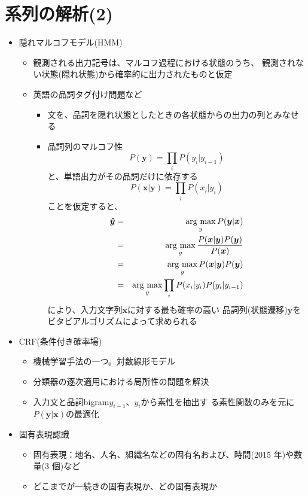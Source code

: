 \documentclass[a4j,11pt]{jsarticle}
\newcommand{\argmax}{\mathop{\rm arg~max}\limits}
\begin{document}
\section{系列の解析(2)}
\begin{itemize}
 \item 隠れマルコフモデル(HMM)
       \begin{itemize}
	\item 観測される出力記号は、マルコフ過程における状態のうち、
	      観測されない状態(隠れ状態)から確率的に出力されたものと仮定
	\item 英語の品詞タグ付け問題など
	      \begin{itemize}
	       \item 文を、品詞を隠れ状態としたときの各状態からの出力の列とみなせる
	       \item 品詞列のマルコフ性
		     \[
		      P(\bm{y}) = \prod_i P(y_i|y_{i-1})
		     \]
		     と、単語出力がその品詞だけに依存する
		     \[
		      P(\bm{x}|\bm{y}) = \prod_i P(x_i|y_i)
		     \]
		     ことを仮定すると、
		     \begin{eqnarray*}
		      \bm{\hat{y}} &=& \argmax_{y} P(\bm{y}|\bm{x}) \\
		      &=& \argmax_{y} \frac{P(\bm{x}|\bm{y})P(\bm{y})}{P(\bm{x})} \\
		      &=& \argmax_{y} P(\bm{x}|\bm{y})P(\bm{y}) \\
		      &=& \argmax_{y} \prod_i{P(x_i|y_i)P(y_i|y_{i-1})}
		     \end{eqnarray*}
		     により、入力文字列$\bm{x}$に対する最も確率の高い
		     品詞列(状態遷移)$\bm{y}$をビタビアルゴリズムによって求められる
	      \end{itemize}
       \end{itemize}
 \item CRF(条件付き確率場)
       \begin{itemize}
	       \item 機械学習手法の一つ。対数線形モデル
	       \item 分類器の逐次適用における局所性の問題を解決
	       \item 入力文と品詞bigram$y_{i-1}$、$y_i$から素性を抽出す
		     る素性関数のみを元に$P(\bm{y}|\bm{x})$の最適化
       \end{itemize}
 \item 固有表現認識
       \begin{itemize}
	\item 固有表現：地名、人名、組織名などの固有名および、時間(2015 年)や数量(3 個)など
	\item どこまでが一続きの固有表現か、どの固有表現か

\end{itemize}
\end{itemize}
\end{document}
